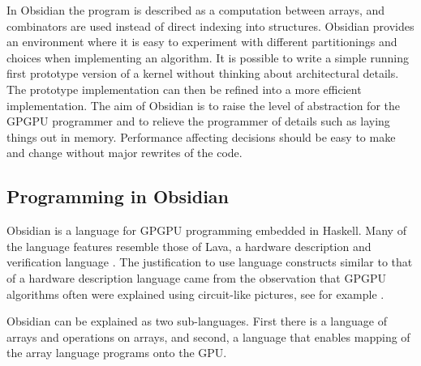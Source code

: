 In Obsidian the program is described as 
a computation between arrays, and combinators are used instead of direct indexing 
into structures. 
Obsidian provides an environment where it is easy to experiment with different
partitionings and choices when implementing an algorithm. It is 
possible to write a simple running first prototype version of a kernel 
without thinking about architectural details. The prototype implementation 
can then be refined into a more efficient implementation. 
The aim of Obsidian is to raise the level of abstraction for the GPGPU 
programmer and to relieve the programmer of details such as laying things out 
in memory. Performance affecting decisions should be easy to make 
and change without major rewrites of the code.



\subsection{Programming in Obsidian} 

Obsidian is a language for GPGPU programming embedded in Haskell. Many of 
the language features resemble those of Lava, a hardware description and 
verification language . The justification to use language 
constructs similar to that of a hardware description language came from 
the observation that GPGPU algorithms often were explained using circuit-like 
pictures, see for example . 


Obsidian can be explained as two sub-languages. First there is a language of 
arrays and operations on arrays, and second, a language that enables mapping of the 
array language programs onto the GPU. 
 
